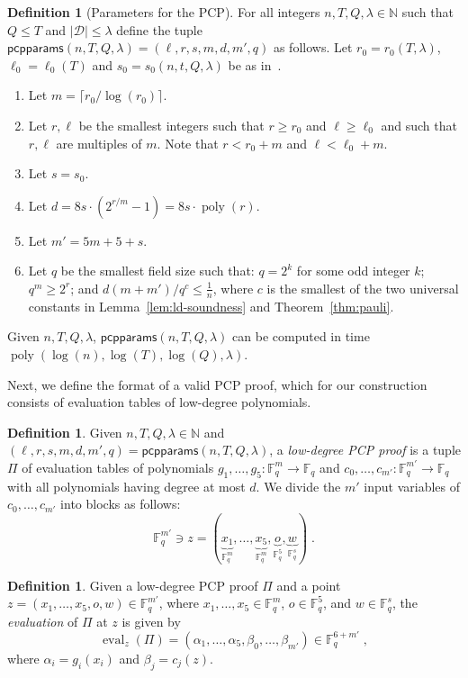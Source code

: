 \documentclass[11pt]{article}
\theoremstyle{definition}
\newtheorem{definition}[theorem]{Definition}
\newcommand{\N}{\ensuremath{\mathbb{N}}}
\newcommand{\F}{\ensuremath{\mathbb{F}}}
\DeclareMathOperator{\poly}{poly}
\newcommand{\decider}{\mathcal{D}}
\newcommand{\pcpparams}{\mathsf{pcpparams}}
\newcommand{\qlen}{Q}
\DeclareMathOperator{\ev}{eval}
\begin{document}
\begin{definition}[Parameters for the PCP]\label{def:pcpparams}
  For all integers $n, T, \qlen, \lambda \in \N$ such that $\qlen \leq T$ and
  $|\decider|\leq \lambda$ define the tuple $\pcpparams(n,T,\qlen,\lambda) =
  (\ell, r, s, m, d, m',q)$ as follows.
  Let $r_0=r_0(T,\lambda)$, $\ell_0=\ell_0(T)$ and $s_0=s_0(n,t,Q,\lambda)$ be
  as in~.
  \begin{enumerate}
  \item Let $m = \lceil r_0 / \log(r_0)\rceil$.
  \item Let $r, \ell$ be the smallest integers such that $r \geq r_0$ and $\ell
    \geq \ell_0$ and such that $r, \ell$ are
    multiples of $m$.
    Note that $r < r_0 + m$ and $\ell < \ell_0+m$.
  \item Let $s = s_0$.
  \item Let $d = 8s \cdot (2^{r/m} - 1) = 8s \cdot \poly(r)$.
  \item Let $m' = 5m + 5 + s$.
	\item Let $q$ be the smallest field size such that: $q=2^k$ for some odd
    integer $k$; $q^{m} \geq 2^r$; and $d(m+m')/q^c \leq
    \frac{1}{n}$, where $c$ is the smallest of the
    two universal constants in Lemma~\ref{lem:ld-soundness} and
    Theorem~\ref{thm:pauli}.
  \end{enumerate}
  Given $n, T, \qlen,\lambda$, $\pcpparams(n, T, \qlen, \lambda)$ can be
  computed in time $\poly(\log(n), \log(T), \log(\qlen), \lambda)$.
\end{definition}

Next, we define the format of a valid PCP proof, which for our construction
consists of evaluation tables of low-degree polynomials.

\begin{definition}\label{def:pcp-proof}
  Given $n, T, \qlen, \lambda \in \N$ and $(\ell, r, s, m, d, m', q)=
  \pcpparams(n, T, \qlen, \lambda)$, a \emph{low-degree PCP proof} is a tuple
  $\Pi$ of evaluation tables of polynomials $g_1, \dots, g_5: \F_q^{m} \to \F_q$
  and $c_0, \dots, c_{m'}: \F_q^{m'} \to \F_q$ with all polynomials having
  degree at most $d$.
  We divide the $m'$ input variables of $c_0, \dots, c_{m'}$ into blocks as
  follows:
  \[
    \F_q^{m'} \ni z = (\underbrace{x_1}_{\F_q^m}, \dots,
    \underbrace{x_5}_{\F_q^m}, \underbrace{o}_{\F_q^5},
    \underbrace{w}_{\F_q^s})\;.
  \]
\end{definition}

\begin{definition}\label{def:pcp-eval}
  Given a low-degree PCP proof $\Pi$ and a point $z = (x_1, \dots, x_5, o, w)
  \in \F_q^{m'}$, where $x_1, \dots, x_5 \in \F_q^{m}$, $o \in \F_q^{5}$, and $w
  \in \F_q^{s}$, the \emph{evaluation} of $\Pi$ at $z$ is given by
  \[
    \ev_z(\Pi) = (\alpha_1, \dots, \alpha_5, \beta_0, \dots, \beta_{m'}) \in
    \F_{q}^{6 + m'}\;,
  \]
  where $\alpha_i = g_i(x_i)$ and $\beta_j = c_j(z)$.
\end{definition}
\end{document}
